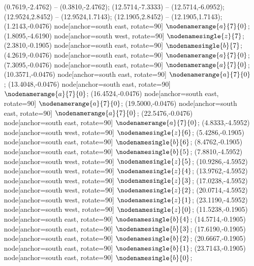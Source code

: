    (0.7619,-2.4762) -- (0.3810,-2.4762);
   (12.5714,-7.3333) -- (12.5714,-6.0952);
   (12.9524,2.8452) -- (12.9524,1.7143);
   (12.1905,2.8452) -- (12.1905,1.7143);
   (1.2143,-0.0476) node[anchor=south east, rotate=90] {$\nodenamerange{a}{7}{0}$};
   (1.8095,-4.6190) node[anchor=south west, rotate=90] {$\nodenamesingle{z}{7}$};
   (2.3810,-0.1905) node[anchor=south east, rotate=90] {$\nodenamesingle{b}{7}$};
   (4.2619,-0.0476) node[anchor=south east, rotate=90] {$\nodenamerange{a}{7}{0}$};
   (7.3095,-0.0476) node[anchor=south east, rotate=90] {$\nodenamerange{a}{7}{0}$};
   (10.3571,-0.0476) node[anchor=south east, rotate=90] {$\nodenamerange{a}{7}{0}$};
   (13.4048,-0.0476) node[anchor=south east, rotate=90] {$\nodenamerange{a}{7}{0}$};
   (16.4524,-0.0476) node[anchor=south east, rotate=90] {$\nodenamerange{a}{7}{0}$};
   (19.5000,-0.0476) node[anchor=south east, rotate=90] {$\nodenamerange{a}{7}{0}$};
   (22.5476,-0.0476) node[anchor=south east, rotate=90] {$\nodenamerange{a}{7}{0}$};
   (4.8333,-4.5952) node[anchor=south west, rotate=90] {$\nodenamesingle{z}{6}$};
   (5.4286,-0.1905) node[anchor=south east, rotate=90] {$\nodenamesingle{b}{6}$};
   (8.4762,-0.1905) node[anchor=south east, rotate=90] {$\nodenamesingle{b}{5}$};
   (7.8810,-4.5952) node[anchor=south west, rotate=90] {$\nodenamesingle{z}{5}$};
   (10.9286,-4.5952) node[anchor=south west, rotate=90] {$\nodenamesingle{z}{4}$};
   (13.9762,-4.5952) node[anchor=south west, rotate=90] {$\nodenamesingle{z}{3}$};
   (17.0238,-4.5952) node[anchor=south west, rotate=90] {$\nodenamesingle{z}{2}$};
   (20.0714,-4.5952) node[anchor=south west, rotate=90] {$\nodenamesingle{z}{1}$};
   (23.1190,-4.5952) node[anchor=south west, rotate=90] {$\nodenamesingle{z}{0}$};
   (11.5238,-0.1905) node[anchor=south east, rotate=90] {$\nodenamesingle{b}{4}$};
   (14.5714,-0.1905) node[anchor=south east, rotate=90] {$\nodenamesingle{b}{3}$};
   (17.6190,-0.1905) node[anchor=south east, rotate=90] {$\nodenamesingle{b}{2}$};
   (20.6667,-0.1905) node[anchor=south east, rotate=90] {$\nodenamesingle{b}{1}$};
   (23.7143,-0.1905) node[anchor=south east, rotate=90] {$\nodenamesingle{b}{0}$};

